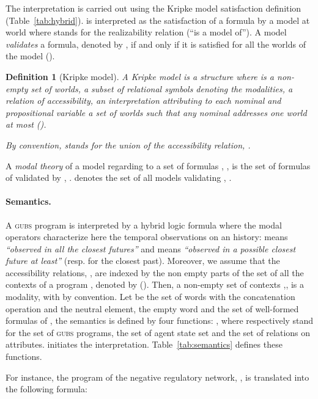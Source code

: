 \documentclass{eptcs}
\newtheorem{definition}{Definition}
\newcommand{\ie}[0]{\abbrev{\textit{i.e.}}}
\newcounter{ti}
\begin{document}
The interpretation is carried out using the Kripke model satisfaction definition (Table~\ref{tab:hybrid}).
 is interpreted as the satisfaction of a formula  by a model  at world  where  stands for the realizability relation (\ie ``is a model of''). A model \emph{validates} a formula, denoted by , if and only if it is satisfied for all the worlds of the model (\ie ).
\begin{definition}[Kripke model]
\label{def:kripke}
A Kripke model is a structure  where  is a non-empty set of \emph{worlds},  a subset of relational symbols denoting the \emph{modalities},  a relation of accessibility,  an interpretation attributing to each nominal and propositional variable a set of worlds such that any nominal addresses one world at most (\ie ).

\medskip
\noindent
By convention,  stands for the union of the accessibility relation, .
\end{definition}
A \emph{modal theory} of a model  regarding to a set of formulas , , is the set of formulas of  validated by , \ie . 
 denotes the set of all models validating , \ie .

\begin{table}[ht]
\small

\label{tab:hybrid}
\caption{Hybrid logic interpretation.}
\end{table}
\paragraph{Semantics.}
A \textsc{gubs} program is interpreted by a hybrid logic formula where the modal operators characterize here the temporal observations on an history:
  means \emph{``observed in all the closest futures''} and  means \emph{``observed in a possible closest future at least''} (resp.  for the closest past). Moreover, we assume that the accessibility relations, , are indexed by the non empty parts of the set of all the contexts of a program , denoted by  (\ie ). Then, a non-empty set of contexts ,, is a modality, \ie  with  by convention.
Let  be the set of words  with the concatenation operation and the neutral element, the empty word  and  the set of well-formed formulas of , the semantics is defined by four functions:
, where  respectively stand for the set of \textsc{gubs} programs, the set of agent state set and the set of relations on attributes.  initiates the interpretation. Table~\ref{tab:semantics} defines these functions. 
\begin{table}[ht]
\footnotesize

\label{tab:semantics}
\caption{Semantics of \textsc{gubs}. In the definition,  represents an attribute,  a behaviour,  an agent,  a set of agent states or an agent state,  a relation on attributes,  a compartment,  a set of contexts and  a set of behaviours (\ie contexts, compartments, dependences, attributes, observation spots).
}
\end{table}
For instance, the program of the negative regulatory network,
, is translated into the following formula:
\end{document}
